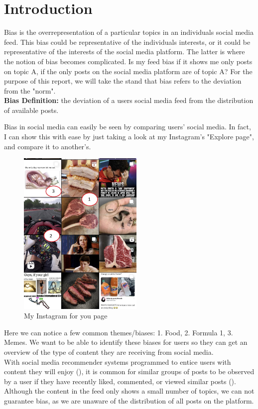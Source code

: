 \section{Introduction}\label{sec:introduction}

Bias is the overrepresentation of a particular topics in an individuals social media feed. This bias could be representative
of the individuals interests, or it could be representative of the interests of the social media platform. The latter is where
the notion of bias becomes complicated. Is my feed bias if it shows me only posts on topic A, if the only posts on the 
social media platform are of topic A? For the purpose of this report, we will take the stand that bias refers to the deviation from
the "norm".\\
\textbf{Bias Definition:} the deviation of a users social media feed from the distribution of available posts.

Bias in social media can easily be seen by comparing users' social media. In fact, I can show this with ease by just taking a look at my
Instagram's "Explore page", and compare it to another's.
\newpage
\begin{figure}[htbp]
    \centering
    \includegraphics[height=80mm]{../images/ig4u.jpg}
    \caption{My Instagram for you page}
    \label{fig:ig4u}
\end{figure}

Here we can notice a few common themes/biases: 1. Food, 2. Formula 1, 3. Memes. We want to be able to identify these biases for users
so they can get an overview of the type of content they are receiving from social media.\\
With social media recommender systems programmed to entice users with content they will enjoy (\cite{recommenderSystems}), it is common for similar groups of posts
to be observed by a user if they have recently liked, commented, or viewed similar posts (\cite{instagram_how_nodate}).\\
Although the content in the feed only shows a small number of topics, we can not guarantee bias, as we are unaware of the 
distribution of all posts on the platform.

